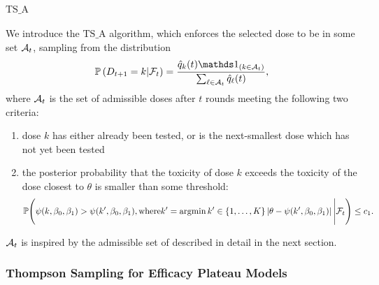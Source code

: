 \paragraph{$\bm{\mathrm{TS}\_\mathrm{A}}$} We introduce the $\mathrm{TS}\_\mathrm{A}$ algorithm, which enforces the selected dose to be in some set $\mathcal{A}_t$, sampling from the distribution 
\[\bP\left(D_{t+1} = k | \cF_{t}\right) = \frac{\hat{q}_k(t) \ind_{\left(k \in \cA_t\right)}}{\sum_{\ell \in \cA_t} \hat{q}_{\ell}(t)},\] where $\mathcal{A}_t$ is the set of admissible doses after $t$ rounds meeting the following two criteria:
\begin{enumerate}
    \item dose $k$ has either already been tested, or is the next-smallest dose which has not yet been tested    
    \item the posterior probability that the toxicity of dose $k$ exceeds the toxicity of the dose closest to $\theta$ is smaller than some threshold:
\[
   \mathbb{P}\Bigg(
    \psi(k,\beta_0,\beta_1) > \psi(k',\beta_0,\beta_1), 
    \text{where} k' = \operatorname*{argmin}{k' \in \{1,\dots,K\}}\left|\theta - \psi(k', \beta_0,\beta_1)\right|
    \Bigg| \mathcal{F}_{t} \Bigg) \leq c_1.
\]
%
\end{enumerate}
$\mathcal{A}_t$ is inspired by the admissible set of \cite{MKR17} described in detail in the next section.


\subsubsection{Thompson Sampling for Efficacy Plateau Models}\label{sec:TSEff}




